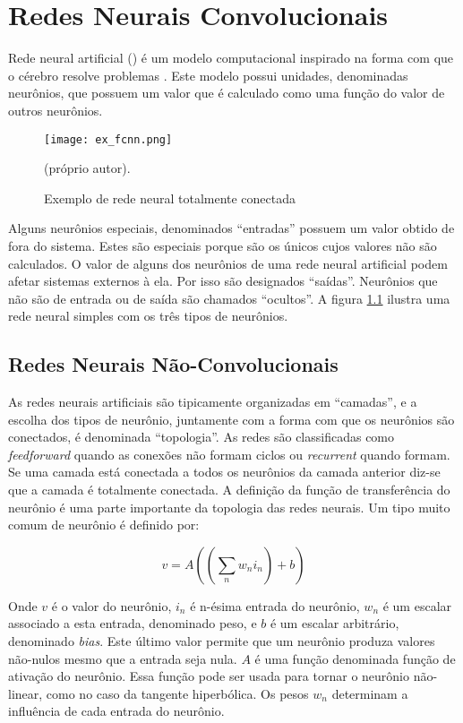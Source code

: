 
\chapter{Redes Neurais Convolucionais}
\setcounter{figure}{100}

Rede neural artificial () é um modelo computacional inspirado na forma com
que o cérebro resolve problemas \cite{gilbert2000build}. Este modelo possui
unidades, denominadas neurônios, que possuem um valor que é calculado como uma
função do valor de outros neurônios.

\begin{figure}[!htb]
	\centering
	\texttt{[image: ex\_fcnn.png]}
	\caption{Exemplo de rede neural totalmente conectada}
	\label{fig:ex_fcnn}
	(próprio autor).
\end{figure}

Alguns neurônios especiais, denominados “entradas” possuem um valor obtido de
fora do sistema. Estes são especiais porque são os únicos cujos valores não são
calculados. O valor de alguns dos neurônios de uma rede neural artificial podem
afetar sistemas externos à ela. Por isso são designados “saídas”. Neurônios que
não são de entrada ou de saída são chamados “ocultos”. A figura
\ref{fig:ex_fcnn} ilustra uma rede neural simples com os três tipos de
neurônios.

\section{Redes Neurais Não-Convolucionais}
As redes neurais artificiais são tipicamente organizadas em “camadas”, e a
escolha dos tipos de neurônio, juntamente com a forma com que os neurônios são
conectados, é denominada “topologia”. As redes são classificadas como
\emph{feedforward} quando as conexões não formam ciclos ou \emph{recurrent}
quando formam. Se
uma camada está conectada a todos os neurônios da camada anterior diz-se que a
camada é totalmente conectada.
A definição da função de transferência do neurônio é uma parte importante da
topologia das redes neurais. Um tipo muito comum de neurônio é definido por:

\begin{equation} \label{eq:non-conv-layer}
	v=A \left( \left( \sum_n w_n i_n \right) + b \right)
\end{equation}

Onde $v$ é o valor do neurônio, $i_n$ é n-ésima entrada do neurônio,
$w_n$ é um escalar associado a esta entrada, denominado peso, e $b$ é um
escalar arbitrário, denominado \emph{bias}. Este último valor permite que um
neurônio produza valores não-nulos mesmo que a entrada seja nula. $A$ é uma
função denominada função de ativação do neurônio. Essa função pode ser usada
para tornar o neurônio não-linear, como no caso da tangente hiperbólica. Os
pesos $w_n$ determinam a influência de cada entrada do neurônio.

